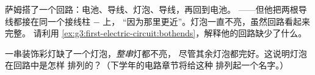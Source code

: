 \begin{exercise}[$\star\star$]\label{exo:g3:first-electric-circuit:10}
萨姆搭了一个回路：电池、导线、灯泡、导线，再回到电池。
——但他把两根导线都接在同一个接线柱 $-$ 上，
“因为那里更近”。灯泡一直不亮，虽然回路看起来完整。
请利用
\cref{ex:g3:first-electric-circuit:bothends}，解释他的回路缺少了什么。
\end{exercise}

\begin{exercise}[$\star\star$]\label{exo:g3:first-electric-circuit:11}
一串装饰彩灯缺了一个灯泡，\emph{整串}灯都不亮，
尽管其余灯泡都完好。这说明灯泡在回路中是怎样
排列的？（下学年的电路章节将给这种
排列起一个名字。）
\end{exercise}
